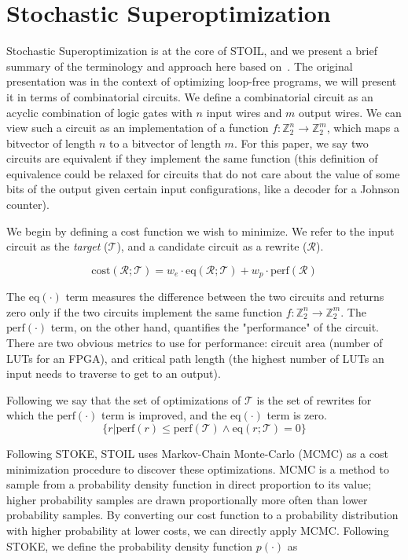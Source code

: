 \documentclass{article}
\newcommand{\R}{\mathcal{R}}
\newcommand{\T}{\mathcal{T}}
\newcommand{\cost}{\mbox{cost}}
\newcommand{\perf}{\mbox{perf}}
\newcommand{\eq}{\mbox{eq}}
\newcommand{\Z}{\mathbb{Z}}
\begin{document}
\section{Stochastic Superoptimization}

Stochastic Superoptimization is at the core of STOIL, and we present a brief summary of the terminology and approach here based on~\cite{stoke16}. The original presentation was in the context of optimizing loop-free programs, we will present it in terms of combinatorial circuits. We define a combinatorial circuit as an acyclic combination of logic gates with $n$ input wires and $m$ output wires. We can view such a circuit as an implementation of a function $f : \Z_2^n \rightarrow \Z_2^m$, which maps a bitvector of length $n$ to a bitvector of length $m$. For this paper, we say two circuits are equivalent if they implement the same function (this definition of equivalence could be relaxed for circuits that do not care about the value of some bits of the output given certain input configurations, like a decoder for a Johnson counter).

We begin by defining a cost function we wish to minimize. We refer to the input circuit as the \emph{target} ($\T$), and a candidate circuit as a rewrite ($\R$).

\begin{equation}
\cost(\R; \T ) = w_e \cdot \eq(\R; \T ) + w_p \cdot \perf(\R)
\end{equation}

The $\eq(\cdot)$ term measures the difference between the two circuits and returns zero only if the two circuits implement the same function $f : \Z_2^n \rightarrow \Z_2^m$. The $\perf(\cdot)$ term, on the other hand, quantifies the "performance" of the circuit. There are two obvious metrics to use for performance: circuit area (number of LUTs for an FPGA), and critical path length (the highest number of LUTs an input needs to traverse to get to an output). 

Following  we say that the set of optimizations of $\T$ is  the set of rewrites for which the $\perf(\cdot)$ term is improved, and the $\eq(\cdot)$ term is zero.
\begin{equation}
\{ r | \perf(r) \le \perf(\T ) \wedge \eq(r; \T ) = 0 \}
\end{equation}

Following STOKE, STOIL uses Markov-Chain Monte-Carlo (MCMC) as a cost minimization procedure to discover these optimizations. MCMC is a method to sample from a probability density function in direct proportion to its value; higher probability samples are drawn proportionally more often than lower probability samples. By converting our cost function to a probability distribution with higher probability at lower costs, we can directly apply MCMC. Following STOKE, we define the probability density function $p(\cdot)$ as
\end{document}
